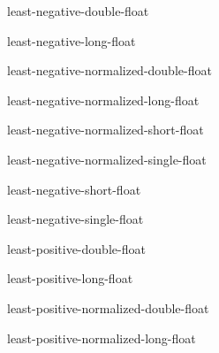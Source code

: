 \begin{constant}{least-negative-double-float}{}{}
  
\end{constant}

\begin{constant}{least-negative-long-float}{}{}
  
\end{constant}

\begin{constant}{least-negative-normalized-double-float}{}{}
  
\end{constant}

\begin{constant}{least-negative-normalized-long-float}{}{}
  
\end{constant}

\begin{constant}{least-negative-normalized-short-float}{}{}
  
\end{constant}

\begin{constant}{least-negative-normalized-single-float}{}{}
  
\end{constant}

\begin{constant}{least-negative-short-float}{}{}
  
\end{constant}

\begin{constant}{least-negative-single-float}{}{}
  
\end{constant}

\begin{constant}{least-positive-double-float}{}{}
  
\end{constant}

\begin{constant}{least-positive-long-float}{}{}
  
\end{constant}

\begin{constant}{least-positive-normalized-double-float}{}{}
  
\end{constant}

\begin{constant}{least-positive-normalized-long-float}{}{}
  
\end{constant}

